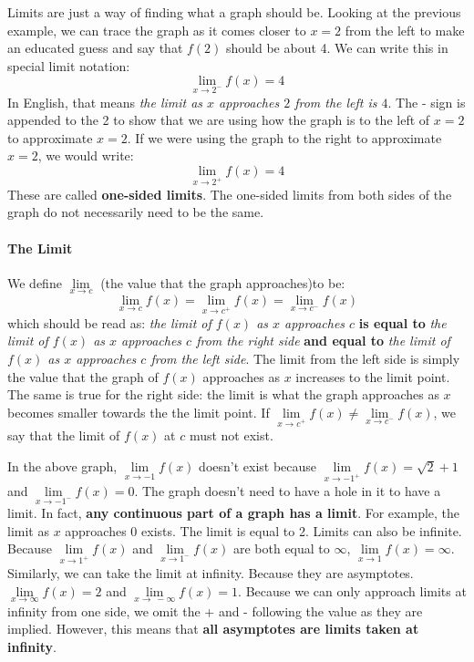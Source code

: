 \documentclass[../revisedMain.tex]{subfiles}
\begin{document}
	\par 	Limits are just a way of finding what a graph should be. Looking at the previous example, we can trace the graph as it comes closer to $x=2$ from the left to make an educated guess and say that $f(2)$ should be about 4. We can write this in special limit notation: $$\lim_{x\to 2^-} f(x) = 4$$ In English, that means \textit{the limit as $x$ approaches $2$ from the left is $4$}. The - sign is appended to the 2 to show that we are using how the graph is to the left of $x=2$ to approximate $x=2$. If we were using the graph to the right to approximate $x=2$, we would write: $$\lim_{x\to 2^+} f(x) = 4$$ These are called \textbf{one-sided limits}. The one-sided limits from both sides of the graph do not necessarily need to be the same.
	\paragraph{The Limit} We define $\lim\limits_{x\to c}$ (the value that the graph approaches)to be:$$\lim_{x\to c} f(x) = \lim_{x\to c^+} f(x) =\lim_{x\to c^-} f(x)$$ which should be read as: \textit{the limit of $f(x)$ as $x$ approaches $c$} \textbf{is equal to} \textit{the limit of $f(x)$ as $x$ approaches $c$ from the right side} \textbf{and equal to} \textit{the limit of $f(x)$ as $x$ approaches $c$ from the left side}. The limit from the left side is simply the value that the graph of $f(x)$ approaches as $x$ increases to the limit point. The same is true for the right side: the limit is what the graph approaches as $x$ becomes smaller towards the the limit point. If $\lim\limits_{x\to c^+} f(x) \neq\lim\limits_{x\to c^-} f(x)$, we say that the limit of $f(x)$ at $c$ must not exist.
	\begin{center}
	\end{center}
	In the above graph, $\lim\limits_{x\to -1} f(x)$ doesn't exist because $\lim\limits_{x\to -1^+} f(x)=\sqrt{2}+1$ and $\lim\limits_{x\to -1^-} f(x)=0$. The graph doesn't need to have a hole in it to have a limit. In fact, \textbf{any continuous part of a graph has a limit}. For example, the limit as $x$ approaches 0 exists. The limit is equal to 2. Limits can also be infinite. Because $\lim\limits_{x\to 1^+} f(x)$ and $\lim\limits_{x\to 1^-} f(x)$ are both equal to $\infty$, $\lim\limits_{x\to 1} f(x)= \infty$. Similarly, we can take the limit at infinity. Because they are asymptotes. $\lim\limits_{x\to\infty} f(x) = 2$ and $\lim\limits_{x\to\ -\infty} f(x) = 1$. Because we can only approach limits at infinity from one side, we omit the + and - following the value as they are implied. However, this means that \textbf{all asymptotes are limits taken at infinity}.
\end{document}
